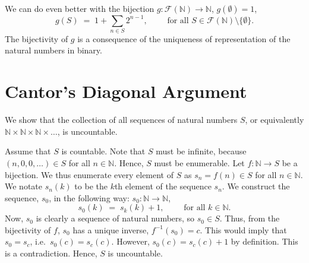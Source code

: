 \documentclass[10pt]{article}
\begin{document}
        We can do even better with the bijection $g\colon \mathcal{F}(\mathbb{N}) \to \mathbb{N}$, $g(\emptyset) = 1$,
        \[
                g(S) \;=\; 1 + \sum_{n \in S} 2^{n - 1}, \quad\quad\text{ for all } S \in \mathcal{F}(\mathbb{N})\setminus\{\emptyset\}.
        \]
        The bijectivity of $g$ is a consequence of the uniqueness of representation of the natural numbers in binary.

        \section*{Cantor's Diagonal Argument}
        We show that the collection of all sequences of natural numbers $S$, or equivalently $\mathbb{N}\times\mathbb{N}\times\mathbb{N}\times\dots$,
        is uncountable.

        Assume that $S$ is countable. Note that $S$ must be infinite, because $(n, 0, 0, \dots) \in S$ for all $n \in \mathbb{N}$.
        Hence, $S$ must be enumerable. Let $f\colon \mathbb{N} \to S$ be a bijection. We thus enumerate every element of 
        $S$ as $s_n = f(n) \in S$ for all $n \in \mathbb{N}$. We notate $s_n(k)$ to be the $k$th element of the sequence $s_n$.
        We construct the sequence, $s_0$, in the following way: $s_0\colon \mathbb{N}\to \mathbb{N}$,
        \[
                s_0(k) \;=\; s_k(k) + 1, \quad\quad\text{ for all } k\in \mathbb{N}.
        \]
        Now, $s_0$ is clearly a sequence of natural numbers, so $s_0 \in S$. Thus, from the bijectivity of $f$, $s_0$ has a unique inverse,
        $f^{-1}(s_0) = c$. This would imply that $s_0 = s_c$, i.e.\ $s_0(c) = s_c(c)$. However, $s_0(c) = s_c(c) + 1$ by definition.
        This is a contradiction. Hence, $S$ is uncountable.
\end{document}
